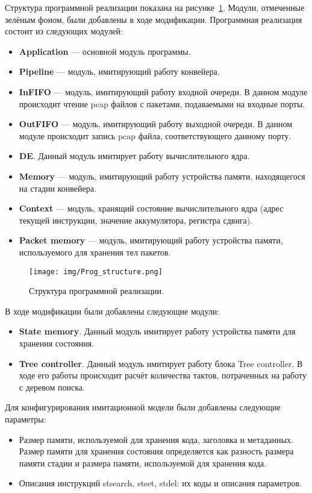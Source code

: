 \documentclass[conference]{IEEEtran}
\begin{document}
Структура программной реализации показана на
рисунке~\ref{float:model:structure}. Модули, отмеченные зелёным
фоном, были добавлены в ходе модификации.
Программная реализация состоит из следующих модулей:
\begin{itemize}
	\item {\bfseries Application} --- основной модуль программы.
	\item {\bfseries Pipeline} --- модуль, имитирующий работу конвейера.
	\item {\bfseries InFIFO} --- модуль, имитирующий работу входной
		очереди. В данном модуле происходит чтение pcap файлов с
		пакетами, подаваемыми на входные порты.
	\item {\bfseries OutFIFO} --- модуль, имитирующий работу выходной
		очереди. В данном модуле происходит запись pcap файла,
		соответствующего данному порту.
	\item {\bfseries DE}. Данный модуль имитирует работу вычислительного
		ядра.
	\item {\bfseries Memory} --- модуль, имитирующий работу устройства
		памяти, находящегося на стадии конвейера.
	\item {\bfseries Context} --- модуль, хранящий состояние
		вычислительного ядра (адрес текущей инструкции,
		значение аккумулятора, регистра сдвига).
	\item {\bfseries Packet memory} --- модуль, имитирующий работу
		устройства памяти, используемого для хранения тел пакетов.
\end{itemize}

\begin{figure}
	\centering
	\texttt{[image: img/Prog\_structure.png]}
	\caption{Структура программной реализации.}
	\label{float:model:structure}
\end{figure}

В ходе модификации были добавлены следующие модули:
\begin{itemize}
	\item {\bfseries State memory}. Данный модуль имитирует работу
		устройства памяти для хранения состояния.
	\item {\bfseries Tree controller}. Данный модуль имитирует работу
		блока Tree controller. В ходе его работы происходит расчёт
		количества тактов, потраченных на работу с деревом поиска.
\end{itemize}

Для конфигурирования имитационной модели были добавлены следующие параметры:
\begin{itemize}
	\item Размер памяти, используемой для хранения кода, заголовка и
		метаданных. Размер памяти для хранения состояния
		определяется как разность размера памяти стадии и размера
		памяти, используемой для хранения кода.
	\item Описания инструкций stsearch, stset, stdel: их коды и
		описания параметров.
\end{itemize}
\end{document}
